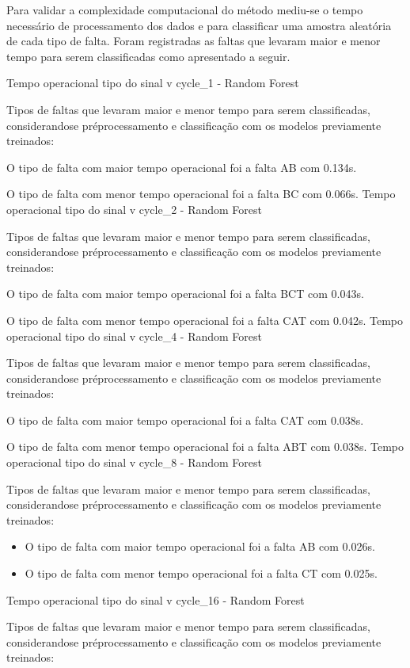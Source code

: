 Para validar a complexidade computacional do método mediu-se o tempo necessário de processamento 
dos dados e para classificar uma amostra aleatória de cada tipo de falta. Foram registradas as 
faltas que levaram maior e menor tempo para serem classificadas como apresentado a seguir.

Tempo operacional tipo do sinal v cycle_1 - Random Forest
\item Tipos de faltas que levaram maior e menor tempo para serem classificadas, considerando\hyph se pré\hyph processamento e classificação com os modelos previamente treinados:
\item O tipo de falta com maior tempo operacional foi a falta AB com 0.134s.
\item O tipo de falta com menor tempo operacional foi a falta BC com 0.066s.
Tempo operacional tipo do sinal v cycle_2 - Random Forest
\item Tipos de faltas que levaram maior e menor tempo para serem classificadas, considerando\hyph se pré\hyph processamento e classificação com os modelos previamente treinados:
\item O tipo de falta com maior tempo operacional foi a falta BCT com 0.043s.
\item O tipo de falta com menor tempo operacional foi a falta CAT com 0.042s.
Tempo operacional tipo do sinal v cycle_4 - Random Forest
\item Tipos de faltas que levaram maior e menor tempo para serem classificadas, considerando\hyph se pré\hyph processamento e classificação com os modelos previamente treinados:
\item O tipo de falta com maior tempo operacional foi a falta CAT com 0.038s.
\item O tipo de falta com menor tempo operacional foi a falta ABT com 0.038s.
Tempo operacional tipo do sinal v cycle_8 - Random Forest
\item Tipos de faltas que levaram maior e menor tempo para serem classificadas, considerando\hyph se pré\hyph processamento e classificação com os modelos previamente treinados:
\begin{itemize}
\item O tipo de falta com maior tempo operacional foi a falta AB com 0.026s.
\item O tipo de falta com menor tempo operacional foi a falta CT com 0.025s.
\end{itemize}
Tempo operacional tipo do sinal v cycle_16 - Random Forest
\item Tipos de faltas que levaram maior e menor tempo para serem classificadas, considerando\hyph se pré\hyph processamento e classificação com os modelos previamente treinados:
